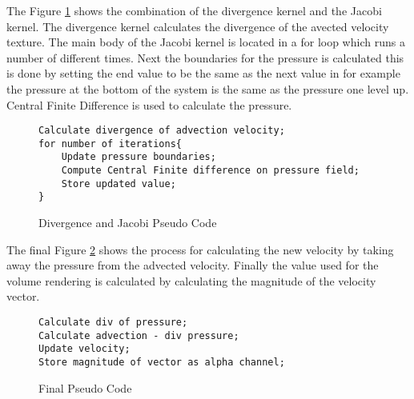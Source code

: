 The Figure \ref{sc:div_jacobi} shows the combination of the divergence kernel and the Jacobi kernel.
The divergence kernel calculates the divergence of the avected velocity texture.
The main body of the Jacobi kernel is located in a for loop which runs a number of different times.
Next the boundaries for the pressure is calculated this is done by setting the end value to be the same as the next value in for example the pressure at the bottom of the system is the same as the pressure one level up.
Central Finite Difference is used to calculate the pressure.

\begin{figure}[h]
\centering
\begin{lstlisting}
Calculate divergence of advection velocity;
for number of iterations{
	Update pressure boundaries;
	Compute Central Finite difference on pressure field;
	Store updated value;
}
\end{lstlisting}
\caption{Divergence and Jacobi Pseudo Code}
\label{sc:div_jacobi}
\end{figure}

The final Figure \ref{sc:cloud_pseudo} shows the process for calculating the new velocity by taking away the pressure from the advected velocity.
Finally the value used for the volume rendering is calculated by calculating the magnitude of the velocity vector.

\begin{figure}[h]
\centering
\begin{lstlisting}
Calculate div of pressure;
Calculate advection - div pressure;
Update velocity;
Store magnitude of vector as alpha channel;
\end{lstlisting}
\caption{Final Pseudo Code}
\label{sc:cloud_pseudo}
\end{figure}